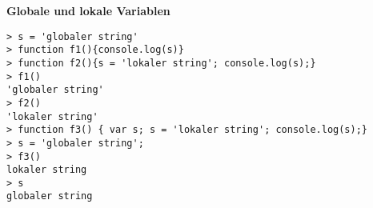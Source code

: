 \vspace{0.5cm}\par\noindent\textbf{Globale und lokale Variablen}\vspace{0.5cm}

\begin{verbatim}
> s = 'globaler string'
> function f1(){console.log(s)}
> function f2(){s = 'lokaler string'; console.log(s);}
> f1()
'globaler string'
> f2()
'lokaler string'
> function f3() { var s; s = 'lokaler string'; console.log(s);}
> s = 'globaler string';
> f3()
lokaler string
> s 
globaler string
\end{verbatim}

